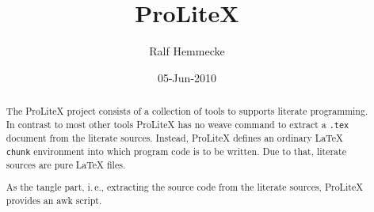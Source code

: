 \documentclass[a4paper]{article} %
\newcommand{\packagename}[1]{{\normalfont\sffamily#1}}
\newcommand\ProLiteX{\textsf{ProLiteX}}
\newcommand{\ie}{i.\,e.}
\begin{document}
\title{\ProLiteX}
\date{05-Jun-2010}
\author{Ralf Hemmecke}
\maketitle

\begin{abstract}
  The \ProLiteX{} project consists of a collection of tools to
  supports literate programming. In contrast to most other tools
  \ProLiteX{} has no weave command to extract a \texttt{.tex} document
  from the literate sources. Instead, \ProLiteX{} defines an ordinary
  \LaTeX{} \texttt{chunk} environment into which program code is to be
  written. Due to that, literate sources are pure \LaTeX{} files.

  As the tangle part, \ie, extracting the source code from the
  literate sources, \ProLiteX{} provides an \packagename{awk} script.
\end{abstract}
\end{document}
